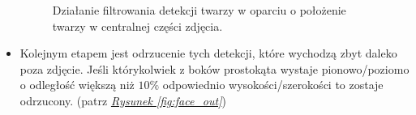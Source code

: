 \begin{itemize}
\begin{figure}[!h]
\begin{center}
        \end{center}
        \caption{Działanie filtrowania detekcji twarzy w oparciu o położenie twarzy w centralnej części zdjęcia.}
        \label{fig:face_boundary}
    \end{figure}
    
    \item Kolejnym etapem jest odrzucenie tych detekcji, które wychodzą zbyt daleko poza zdjęcie. Jeśli którykolwiek z boków prostokąta wystaje pionowo/poziomo o odległość większą niż $10\%$ odpowiednio wysokości/szerokości to zostaje odrzucony. (patrz \hyperref[{fig:face_out}]{\textit{Rysunek \ref{fig:face_out}}})
    

\end{itemize}
